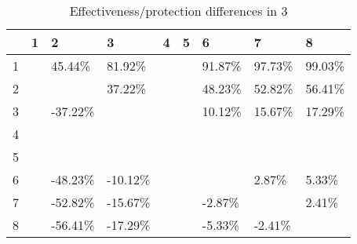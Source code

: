 \begin{table}[ht]
\centering
\begin{tabular}{rllllllll}
  \hline
 & 1 & 2 & 3 & 4 & 5 & 6 & 7 & 8 \\ 
  \hline
1 &  & 45.44\% & 81.92\% &  &  & 91.87\% & 97.73\% & 99.03\% \\ 
  2 &  &  & 37.22\% &  &  & 48.23\% & 52.82\% & 56.41\% \\ 
  3 &  & -37.22\% &  &  &  & 10.12\% & 15.67\% & 17.29\% \\ 
  4 &  &  &  &  &  &  &  &  \\ 
  5 &  &  &  &  &  &  &  &  \\ 
  6 &  & -48.23\% & -10.12\% &  &  &  & 2.87\% & 5.33\% \\ 
  7 &  & -52.82\% & -15.67\% &  &  & -2.87\% &  & 2.41\% \\ 
  8 &  & -56.41\% & -17.29\% &  &  & -5.33\% & -2.41\% &  \\ 
   \hline
\end{tabular}
\caption{Effectiveness/protection differences in  3} 
\end{table}
